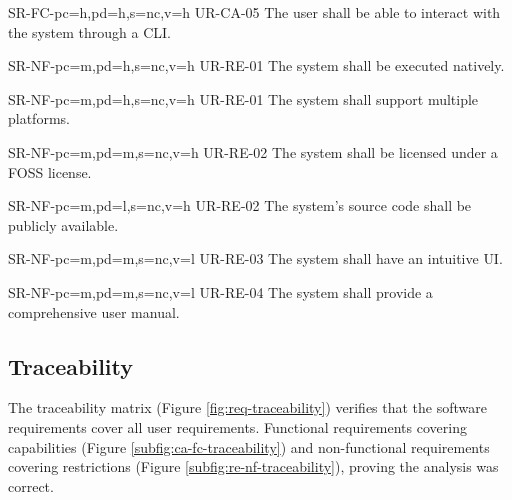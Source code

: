 \begin{softwareReq}{SR-FC-}{pc=h,pd=h,s=nc,v=h}
  {UR-CA-05}
  The user shall be able to interact with the system through a \gls{CLI}.
\end{softwareReq}


\setcounter{i}{1}

\begin{softwareReq}{SR-NF-}{pc=m,pd=h,s=nc,v=h}
  {UR-RE-01}
  The system shall be executed natively.
\end{softwareReq}

\begin{softwareReq}{SR-NF-}{pc=m,pd=h,s=nc,v=h}
  {UR-RE-01}
  The system shall support multiple platforms.
\end{softwareReq}

\begin{softwareReq}{SR-NF-}{pc=m,pd=m,s=nc,v=h}
  {UR-RE-02}
  The system shall be licensed under a \gls{FOSS} license.
\end{softwareReq}

\begin{softwareReq}{SR-NF-}{pc=m,pd=l,s=nc,v=h}
  {UR-RE-02}
  The system's source code shall be publicly available.
\end{softwareReq}

\begin{softwareReq}{SR-NF-}{pc=m,pd=m,s=nc,v=l}
  {UR-RE-03}
  The system shall have an intuitive \gls{UI}.
\end{softwareReq}

\begin{softwareReq}{SR-NF-}{pc=m,pd=m,s=nc,v=l}
  {UR-RE-04}
  The system shall provide a comprehensive user manual.
\end{softwareReq}

\FloatBarrier


\subsection{Traceability}\label{subsec:req-traceability}
The traceability matrix (Figure \ref{fig:req-traceability}) verifies that the software requirements cover all user requirements. Functional requirements covering capabilities (Figure \ref{subfig:ca-fc-traceability}) and non-functional requirements covering restrictions (Figure \ref{subfig:re-nf-traceability}), proving the analysis was correct.

